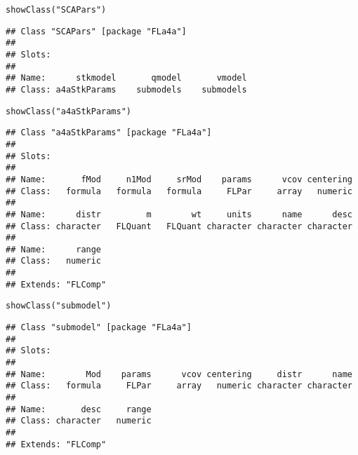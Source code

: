 \documentclass[a4paper,english,10pt]{article}\usepackage[]{graphicx}\usepackage[]{color}
\makeatletter
\newcommand{\hlstr}[1]{\textcolor[rgb]{0.2,0.2,0.2}{#1}}%
\newcommand{\hlstd}[1]{\textcolor[rgb]{0,0,0}{#1}}%
\newcommand{\hlkwd}[1]{\textcolor[rgb]{0.361,0.506,0.596}{#1}}%
\newenvironment{kframe}{%
 \def\at@end@of@kframe{}%
 \ifinner\ifhmode%
  \def\at@end@of@kframe{\end{minipage}}%
  \begin{minipage}{\columnwidth}%
 \fi\fi%
 \def\FrameCommand##1{\hskip\@totalleftmargin \hskip-\fboxsep
 \colorbox{shadecolor}{##1}\hskip-\fboxsep
     \hskip-\linewidth \hskip-\@totalleftmargin \hskip\columnwidth}%
 \MakeFramed {\advance\hsize-\width
   \@totalleftmargin\z@ \linewidth\hsize
   \@setminipage}}%
 {\par\unskip\endMakeFramed%
 \at@end@of@kframe}
\newenvironment{knitrout}{}{} %
\makeatother
\begin{document}
\begin{knitrout}
\color{fgcolor}\begin{kframe}
\begin{alltt}
\hlkwd{showClass}\hlstd{(}\hlstr{"SCAPars"}\hlstd{)}
\end{alltt}
\begin{verbatim}
## Class "SCAPars" [package "FLa4a"]
## 
## Slots:
##                                              
## Name:      stkmodel       qmodel       vmodel
## Class: a4aStkParams    submodels    submodels
\end{verbatim}
\begin{alltt}
\hlkwd{showClass}\hlstd{(}\hlstr{"a4aStkParams"}\hlstd{)}
\end{alltt}
\begin{verbatim}
## Class "a4aStkParams" [package "FLa4a"]
## 
## Slots:
##                                                                   
## Name:       fMod     n1Mod     srMod    params      vcov centering
## Class:   formula   formula   formula     FLPar     array   numeric
##                                                                   
## Name:      distr         m        wt     units      name      desc
## Class: character   FLQuant   FLQuant character character character
##                 
## Name:      range
## Class:   numeric
## 
## Extends: "FLComp"
\end{verbatim}
\begin{alltt}
\hlkwd{showClass}\hlstd{(}\hlstr{"submodel"}\hlstd{)}
\end{alltt}
\begin{verbatim}
## Class "submodel" [package "FLa4a"]
## 
## Slots:
##                                                                   
## Name:        Mod    params      vcov centering     distr      name
## Class:   formula     FLPar     array   numeric character character
##                           
## Name:       desc     range
## Class: character   numeric
## 
## Extends: "FLComp"
\end{verbatim}
\end{kframe}
\end{knitrout}

\begin{knitrout}
\color{fgcolor}\begin{kframe}


{\ttfamily\noindent\bfseries{}}\end{kframe}
\end{knitrout}
\end{document}
